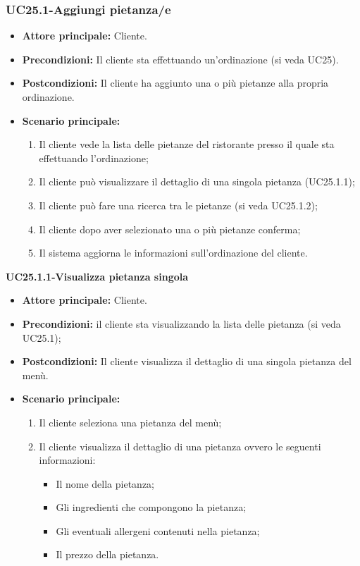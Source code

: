 \subsubsection{UC25.1-Aggiungi pietanza/e}
\begin{itemize}
\item \textbf{Attore principale:} Cliente.
\item \textbf{Precondizioni:} Il cliente sta effettuando un'ordinazione (si veda UC25).
\item \textbf{Postcondizioni:} Il cliente ha aggiunto una o più pietanze alla propria ordinazione.
\item \textbf{Scenario principale:}
\begin{enumerate}
    \item Il cliente vede la lista delle pietanze del ristorante presso il quale sta effettuando l'ordinazione;
    \item Il cliente può visualizzare il dettaglio di una singola pietanza (UC25.1.1);
    \item Il cliente può fare una ricerca tra le pietanze (si veda UC25.1.2);
    \item Il cliente dopo aver selezionato una o più pietanze conferma;
    \item Il sistema aggiorna le informazioni sull'ordinazione del cliente.
\end{enumerate}
\end{itemize}

\textbf{UC25.1.1-Visualizza pietanza singola}
\begin{itemize}
\item \textbf{Attore principale:} Cliente.
\item \textbf{Precondizioni:} il cliente sta visualizzando la lista delle pietanza (si veda UC25.1);
\item \textbf{Postcondizioni:} Il cliente visualizza il dettaglio di una singola pietanza del menù.
\item \textbf{Scenario principale:}
\begin{enumerate}
    \item Il cliente seleziona una pietanza del menù;
    \item Il cliente visualizza il dettaglio di una pietanza ovvero le seguenti informazioni:
    \begin{itemize}
        \item Il nome della pietanza;
        \item Gli ingredienti che compongono la pietanza;
        \item Gli eventuali allergeni contenuti nella pietanza;
        \item Il prezzo della pietanza.
    \end{itemize}
\end{enumerate}
\end{itemize}

